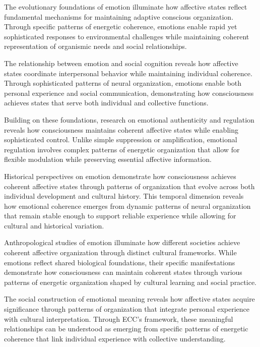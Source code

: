\begin{refsection}
The evolutionary foundations of emotion \cite{Panksepp1998} illuminate how affective states reflect fundamental mechanisms for maintaining adaptive conscious organization. Through specific patterns of energetic coherence, emotions enable rapid yet sophisticated responses to environmental challenges while maintaining coherent representation of organismic needs and social relationships.

The relationship between emotion and social cognition \cite{Scherer2014} reveals how affective states coordinate interpersonal behavior while maintaining individual coherence. Through sophisticated patterns of neural organization, emotions enable both personal experience and social communication, demonstrating how consciousness achieves states that serve both individual and collective functions.

Building on these foundations, research on emotional authenticity and regulation \cite{Ekman2003} reveals how consciousness maintains coherent affective states while enabling sophisticated control. Unlike simple suppression or amplification, emotional regulation involves complex patterns of energetic organization that allow for flexible modulation while preserving essential affective information.

Historical perspectives on emotion \cite{Reddy2001} demonstrate how consciousness achieves coherent affective states through patterns of organization that evolve across both individual development and cultural history. This temporal dimension reveals how emotional coherence emerges from dynamic patterns of neural organization that remain stable enough to support reliable experience while allowing for cultural and historical variation.

Anthropological studies of emotion \cite{Rosaldo1980} illuminate how different societies achieve coherent affective organization through distinct cultural frameworks. While emotions reflect shared biological foundations, their specific manifestations demonstrate how consciousness can maintain coherent states through various patterns of energetic organization shaped by cultural learning and social practice.

The social construction of emotional meaning \cite{White1994} reveals how affective states acquire significance through patterns of organization that integrate personal experience with cultural interpretation. Through ECC's framework, these meaningful relationships can be understood as emerging from specific patterns of energetic coherence that link individual experience with collective understanding.


\end{refsection}

